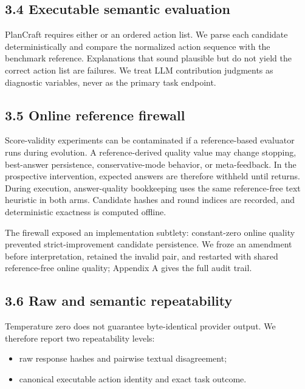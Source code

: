 \documentclass{article}
\begin{document}
\subsection{3.4 Executable semantic evaluation}

PlanCraft requires either \texttt{} or an ordered action list. We parse each candidate deterministically and compare the normalized action sequence with the benchmark reference. Explanations that sound plausible but do not yield the correct action list are failures. We treat LLM contribution judgments as diagnostic variables, never as the primary task endpoint.

\subsection{3.5 Online reference firewall}

Score-validity experiments can be contaminated if a reference-based evaluator runs during evolution. A reference-derived quality value may change stopping, best-answer persistence, conservative-mode behavior, or meta-feedback. In the prospective intervention, expected answers are therefore withheld until \texttt{} returns. During execution, answer-quality bookkeeping uses the same reference-free text heuristic in both arms. Candidate hashes and round indices are recorded, and deterministic exactness is computed offline.

The firewall exposed an implementation subtlety: constant-zero online quality prevented strict-improvement candidate persistence. We froze an amendment before interpretation, retained the invalid pair, and restarted with shared reference-free online quality; Appendix A gives the full audit trail.

\subsection{3.6 Raw and semantic repeatability}

Temperature zero does not guarantee byte-identical provider output. We therefore report two repeatability levels:

\begin{itemize}
  \item raw response hashes and pairwise textual disagreement;
  \item canonical executable action identity and exact task outcome.
\end{itemize}
\end{document}
